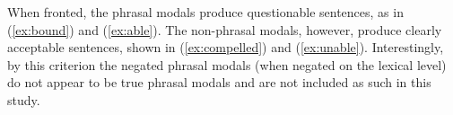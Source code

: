 \documentclass[main.tex]{subfiles}
\begin{document}
When fronted, the phrasal modals produce questionable sentences, as in (\ref{ex:bound}) and (\ref{ex:able}). The non-phrasal modals, however, produce clearly acceptable sentences, shown in (\ref{ex:compelled}) and (\ref{ex:unable}). Interestingly, by this criterion the negated phrasal modals (when negated on the lexical level) do not appear to be true phrasal modals and are not included as such in this study.
\end{document}
